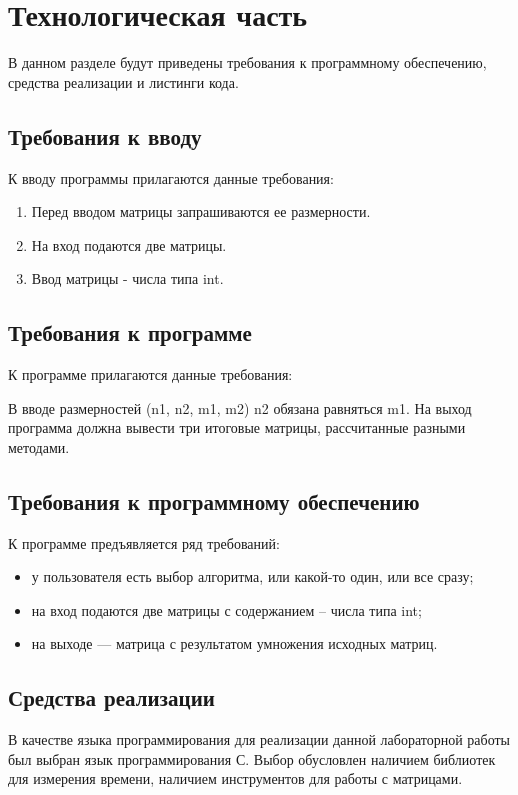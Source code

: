 \chapter{Технологическая часть}

В данном разделе будут приведены требования к программному обеспечению, средства реализации и листинги кода.

\section{Требования к вводу}
К вводу программы прилагаются данные требования:
\begin{enumerate}
	\item Перед вводом матрицы запрашиваются ее размерности.
	\item На вход подаются две матрицы.
	\item Ввод матрицы - числа типа int.
\end{enumerate}

\section{Требования к программе}
К программе прилагаются данные требования:

В вводе размерностей (n1, n2, m1, m2) n2 обязана равняться m1. На выход программа должна вывести три итоговые матрицы, рассчитанные разными методами.


\section{Требования к программному обеспечению}

К программе предъявляется ряд требований:
\begin{itemize}
	\item у пользователя есть выбор алгоритма, или какой-то один, или все сразу;
	\item на вход подаются две матрицы с содержанием -- числа типа int;
	\item на выходе — матрица с результатом умножения исходных матриц.
\end{itemize}

\section{Средства реализации}

В качестве языка программирования для реализации данной лабораторной работы был выбран язык программирования С. Выбор обусловлен наличием библиотек для измерения времени, наличием инструментов для работы с матрицами.


